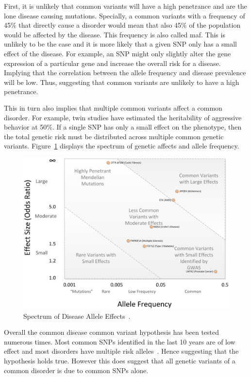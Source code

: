 \documentclass[../header.tex]{subfiles}
\begin{document}
First, it is unlikely that common variants will have a high penetrance and are the lone disease causing mutations.
Specially, a common variants with a frequency of 45\% that directly cause a disorder would mean that also 45\% of the population would be affected by the disease.
This frequency is also called \acrfull{maf}.
This is unlikely to be the case and it is more likely that a given SNP only has a small effect of the disease.
For example, an SNP might only slightly alter the gene expression of a particular gene and increase the overall risk for a disease.
Implying that the correlation between the allele frequency and disease prevalence will be low.
Thus, suggesting that common variants are unlikely to have a high penetrance.

This in turn also implies that multiple common variants affect a common disorder.
For example, twin studies have estimated the heritability of aggressive behavior at 50\%.
If a single SNP has only a small effect on the phenotype, then the total genetic risk must be distributed across multiple common genetic variants.
Figure~\ref{fig:rare_comon} displays the spectrum of genetic affects and allele frequency.

\begin{figure}[htpb]
  \centering
  \includegraphics[width=0.8\linewidth]{figure/journal.pcbi.1002822.g001.png}
  \caption{Spectrum of Disease Allele Effects~\cite{Bush2012}.}\label{fig:rare_comon}
\end{figure}

Overall the common disease common variant hypothesis has been tested numerous times.
Most common SNPs identified in the last 10 years are of low effect and most disorders have multiple risk alleles~\cite{Welter2014}.
Hence suggesting that the hypothesis holds true. 
However this does suggest that all genetic variants of a common disorder is due to common SNPs alone.
\end{document}
